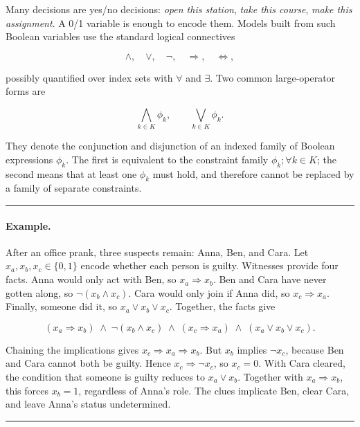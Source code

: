 Many decisions are yes/no decisions: \emph{open this station},
\emph{take this course}, \emph{make this assignment}. A 0/1 variable is
enough to encode them. Models built from such Boolean variables use the
standard logical connectives

\[
\land, \quad \lor, \quad \neg, \quad \Rightarrow, \quad \Leftrightarrow,
\]

possibly quantified over index sets with \(\forall\) and \(\exists\).
Two common large-operator forms are

\[
\bigwedge_{k \in K} \phi_k, \qquad \bigvee_{k \in K} \phi_k.
\]

They denote the conjunction and disjunction of an indexed family of
Boolean expressions \(\phi_k\). The first is equivalent to the
constraint family \(\phi_k ;\forall k \in K\); the second means that at
least one \(\phi_k\) must hold, and therefore cannot be replaced by a
family of separate constraints.

\begin{center}\rule{0.5\linewidth}{0.5pt}\end{center}

\paragraph{Example.} After an office prank, three suspects remain: Anna,
Ben, and Cara. Let \(x_a, x_b, x_c \in \{0,1\}\) encode whether each
person is guilty. Witnesses provide four facts. Anna would only act with
Ben, so \(x_a \Rightarrow x_b\). Ben and Cara have never gotten along,
so \(\neg(x_b \land x_c)\). Cara would only join if Anna did, so
\(x_c \Rightarrow x_a\). Finally, someone did it, so
\(x_a \lor x_b \lor x_c\). Together, the facts give

\[
(x_a \Rightarrow x_b) \;\land\; \neg(x_b \land x_c) \;\land\; (x_c \Rightarrow x_a) \;\land\; (x_a \lor x_b \lor x_c).
\]

Chaining the implications gives \(x_c \Rightarrow x_a \Rightarrow x_b\).
But \(x_b\) implies \(\neg x_c\), because Ben and Cara cannot both be
guilty. Hence \(x_c \Rightarrow \neg x_c\), so \(x_c = 0\). With Cara
cleared, the condition that someone is guilty reduces to
\(x_a \lor x_b\). Together with \(x_a \Rightarrow x_b\), this forces
\(x_b = 1\), regardless of Anna's role. The clues implicate Ben, clear
Cara, and leave Anna's status undetermined.

\begin{center}\rule{0.5\linewidth}{0.5pt}\end{center}

